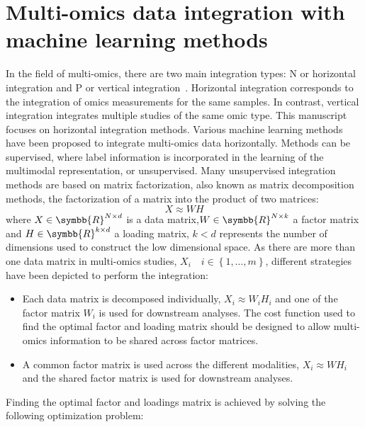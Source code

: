 \documentclass[../main.tex]{subfiles}
\begin{document}


\section[Multi-omics integration with ML]{Multi-omics data integration with machine learning methods}
	In the field of multi-omics, there are two main integration types: N or horizontal integration and P or vertical integration~\cite{Tseng2012}.
	Horizontal integration corresponds to the integration of omics measurements for the same samples.
	In contrast, vertical integration integrates multiple studies of the same omic type.
	This manuscript focuses on horizontal integration methods.
	Various machine learning methods have been proposed to integrate multi-omics data horizontally.
	Methods can be supervised, where label information is incorporated in the learning of the multimodal representation, or unsupervised.
	Many unsupervised integration methods are based on matrix factorization, also known as matrix decomposition methods, the factorization of a matrix into the product of two matrices:
	\begin{equation}
		X \approx WH
	\end{equation}
	where \(X \in \symbb{R}^{N\times d}\) is a data matrix,\(W \in \symbb{R}^{N\times k}\) a factor matrix and \(H \in \symbb{R}^{k\times d}\) a loading matrix, \(k < d\) represents the number of dimensions used to construct the low dimensional space.
	As there are more than one data matrix in multi-omics studies, \(X_i\quad i \in \left\{1, \ldots, m\right\}\), different strategies have been depicted to perform the integration:
	\begin{itemize}[nosep]
		\item Each data matrix is decomposed individually, \(X_i \approx W_i H_i\) and one of the factor matrix \(W_i\) is used for downstream analyses. The cost function used to find the optimal factor and loading matrix should be designed to allow multi-omics information to be shared across factor matrices.
		\item A common factor matrix is used across the different modalities, \(X_i \approx WH_i\) and the shared factor matrix is used for downstream analyses.
	\end{itemize}
	Finding the optimal factor and loadings matrix is achieved by solving the following optimization problem:
\end{document}
